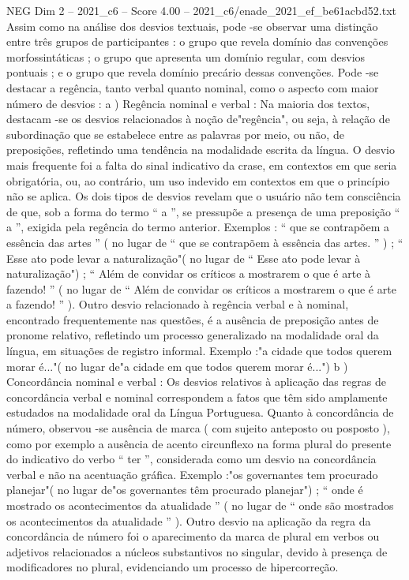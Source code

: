 \begin{textsample}{NEG Dim 2 – 2021\_c6 – Score 4.00 – 2021\_c6/enade\_2021\_ef\_be61acbd52.txt}
Assim como na análise dos desvios textuais, pode -se observar uma distinção entre três grupos de participantes : o grupo que revela domínio das convenções morfossintáticas ; o grupo que apresenta um domínio regular, com desvios pontuais ; e o grupo que revela domínio precário dessas convenções.
Pode -se destacar a regência, tanto verbal quanto nominal, como o aspecto com maior número de desvios : a ) Regência nominal e verbal : Na maioria dos textos, destacam -se os desvios relacionados à noção de"regência", ou seja, à relação de subordinação que se estabelece entre as palavras por meio, ou não, de preposições, refletindo uma tendência na modalidade escrita da língua.
O desvio mais frequente foi a falta do sinal indicativo da crase, em contextos em que seria obrigatória, ou, ao contrário, um uso indevido em contextos em que o princípio não se aplica.
Os dois tipos de desvios revelam que o usuário não tem consciência de que, sob a forma do termo “ a ”, se pressupõe a presença de uma preposição “ a ”, exigida pela regência do termo anterior.
Exemplos : “ que se contrapõem a essência das artes ” ( no lugar de “ que se contrapõem à essência das artes. ” ) ; “ Esse ato pode levar a naturalização"( no lugar de “ Esse ato pode levar à naturalização") ; “ Além de convidar os críticos a mostrarem o que é arte à fazendo! ” ( no lugar de “ Além de convidar os críticos a mostrarem o que é arte a fazendo! ” ).
Outro desvio relacionado à regência verbal e à nominal, encontrado frequentemente nas questões, é a ausência de preposição antes de pronome relativo, refletindo um processo generalizado na modalidade oral da língua, em situações de registro informal.
Exemplo :"a cidade que todos querem morar é..."( no lugar de"a cidade em que todos querem morar é...") b ) Concordância nominal e verbal : Os desvios relativos à aplicação das regras de concordância verbal e nominal correspondem a fatos que têm sido amplamente estudados na modalidade oral da Língua Portuguesa.
Quanto à concordância de número, observou -se ausência de marca ( com sujeito anteposto ou posposto ), como por exemplo a ausência de acento circunflexo na forma plural do presente do indicativo do verbo “ ter ”, considerada como um desvio na concordância verbal e não na acentuação gráfica.
Exemplo :"os governantes tem procurado planejar"( no lugar de"os governantes têm procurado planejar") ; “ onde é mostrado os acontecimentos da atualidade ” ( no lugar de “ onde são mostrados os acontecimentos da atualidade ” ).
Outro desvio na aplicação da regra da concordância de número foi o aparecimento da marca de plural em verbos ou adjetivos relacionados a núcleos substantivos no singular, devido à presença de modificadores no plural, evidenciando um processo de hipercorreção.

\end{textsample}

